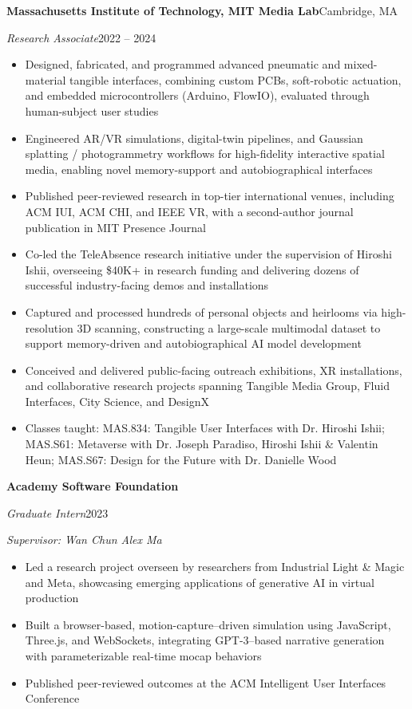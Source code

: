 \documentclass[10pt,letterpaper]{article}
\newcommand{\entry}[4]{%
  \par\addvspace{2.5pt}%
  {\large\bfseries #1}\hfill #2\par\nobreak
  \textit{#3}\hfill #4\par\nobreak}
\newcommand{\mentor}[1]{\textit{#1}\par\nobreak}
\newenvironment{bullets}{%
  \begin{itemize}[leftmargin=0.95em,labelsep=0.35em,itemsep=0pt,parsep=0pt,topsep=1pt,partopsep=0pt,
    label={\raisebox{0.25ex}{\tiny$\bullet$}}]}{\end{itemize}}
\begin{document}
\entry{Massachusetts Institute of Technology, MIT Media Lab}{Cambridge, MA}{Research Associate}{2022 -- 2024}
\begin{bullets}
\item Designed, fabricated, and programmed advanced pneumatic and mixed-material tangible interfaces, combining custom PCBs, soft-robotic actuation, and embedded microcontrollers (Arduino, FlowIO), evaluated through human-subject user studies
\item Engineered AR/VR simulations, digital-twin pipelines, and Gaussian splatting / photogrammetry workflows for high-fidelity interactive spatial media, enabling novel memory-support and autobiographical interfaces
\item Published peer-reviewed research in top-tier international venues, including ACM IUI, ACM CHI, and IEEE VR, with a second-author journal publication in MIT Presence Journal
\item Co-led the TeleAbsence research initiative under the supervision of Hiroshi Ishii, overseeing \$40K+ in research funding and delivering dozens of successful industry-facing demos and installations
\item Captured and processed hundreds of personal objects and heirlooms via high-resolution 3D scanning, constructing a large-scale multimodal dataset to support memory-driven and autobiographical AI model development
\item Conceived and delivered public-facing outreach exhibitions, XR installations, and collaborative research projects spanning Tangible Media Group, Fluid Interfaces, City Science, and DesignX
\item Classes taught: MAS.834: Tangible User Interfaces with Dr. Hiroshi Ishii; MAS.S61: Metaverse with Dr. Joseph Paradiso, Hiroshi Ishii \& Valentin Heun; MAS.S67: Design for the Future with Dr. Danielle Wood
\end{bullets}

\entry{Academy Software Foundation}{}{Graduate Intern}{2023}
\mentor{Supervisor: Wan Chun Alex Ma}
\begin{bullets}
\item Led a research project overseen by researchers from Industrial Light \& Magic and Meta, showcasing emerging applications of generative AI in virtual production
\item Built a browser-based, motion-capture--driven simulation using JavaScript, Three.js, and WebSockets, integrating GPT-3--based narrative generation with parameterizable real-time mocap behaviors
\item Published peer-reviewed outcomes at the ACM Intelligent User Interfaces Conference
\end{bullets}
\end{document}
